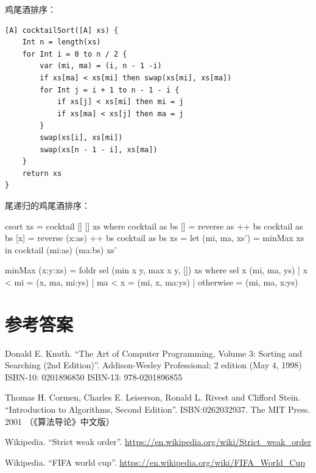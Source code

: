 \documentclass[b5paper]{ctexart}
\begin{document}
鸡尾酒排序：

\begin{lstlisting}[language = Bourbaki]
[A] cocktailSort([A] xs) {
    Int n = length(xs)
    for Int i = 0 to n / 2 {
        var (mi, ma) = (i, n - 1 -i)
        if xs[ma] < xs[mi] then swap(xs[mi], xs[ma])
        for Int j = i + 1 to n - 1 - i {
            if xs[j] < xs[mi] then mi = j
            if xs[ma] < xs[j] then ma = j
        }
        swap(xs[i], xs[mi])
        swap(xs[n - 1 - i], xs[ma])
    }
    return xs
}
\end{lstlisting}

尾递归的鸡尾酒排序：

\begin{Haskell}
csort xs = cocktail [] [] xs
  where
    cocktail as bs []  = reverse as ++ bs
    cocktail as bs [x] = reverse (x:as) ++ bs
    cocktail as bs xs  = let (mi, ma, xs') = minMax xs
                         in cocktail (mi:as) (ma:bs) xs'

minMax (x:y:xs) = foldr sel (min x y, max x y, []) xs
  where
    sel x (mi, ma, ys) | x < mi = (x, ma, mi:ys)
                       | ma < x = (mi, x, ma:ys)
                       | otherwise = (mi, ma, x:ys)
\end{Haskell}

\ifx\wholebook\relax\else
\section{参考答案}
\shipoutAnswer

\begin{thebibliography}{99}

Donald E. Knuth. ``The Art of Computer Programming, Volume 3: Sorting and Searching (2nd Edition)''. Addison-Wesley Professional; 2 edition (May 4, 1998) ISBN-10: 0201896850 ISBN-13: 978-0201896855

Thomas H. Cormen, Charles E. Leiserson, Ronald L. Rivest and Clifford Stein.
``Introduction to Algorithms, Second Edition''. ISBN:0262032937. The MIT Press. 2001 （《算法导论》中文版）

Wikipedia. ``Strict weak order''. \url{https://en.wikipedia.org/wiki/Strict_weak_order}

Wikipedia. ``FIFA world cup''. \url{https://en.wikipedia.org/wiki/FIFA_World_Cup}

\end{thebibliography}
\end{document}
